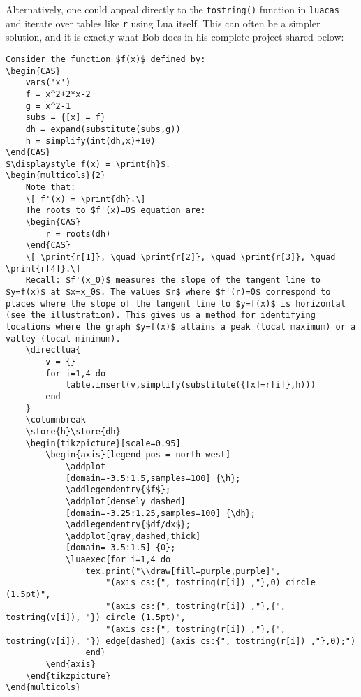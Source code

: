 \documentclass{article}
\begin{document}
Alternatively, one could appeal directly to the \texttt{tostring()} function in \texttt{luacas} and iterate over tables like \texttt{r} using Lua itself. This can often be a simpler solution, and it is exactly what Bob does in his complete project shared below:
\begin{verbatim}
Consider the function $f(x)$ defined by:
\begin{CAS}
    vars('x')
    f = x^2+2*x-2
    g = x^2-1
    subs = {[x] = f}
    dh = expand(substitute(subs,g))
    h = simplify(int(dh,x)+10)
\end{CAS}
$\displaystyle f(x) = \print{h}$.
\begin{multicols}{2}
    Note that: 
    \[ f'(x) = \print{dh}.\] 
    The roots to $f'(x)=0$ equation are:
    \begin{CAS}
        r = roots(dh)
    \end{CAS}
    \[ \print{r[1]}, \quad \print{r[2]}, \quad \print{r[3]}, \quad \print{r[4]}.\] 
    Recall: $f'(x_0)$ measures the slope of the tangent line to $y=f(x)$ at $x=x_0$. The values $r$ where $f'(r)=0$ correspond to places where the slope of the tangent line to $y=f(x)$ is horizontal (see the illustration). This gives us a method for identifying locations where the graph $y=f(x)$ attains a peak (local maximum) or a valley (local minimum). 
    \directlua{
        v = {}
        for i=1,4 do 
            table.insert(v,simplify(substitute({[x]=r[i]},h)))
        end
    }
    \columnbreak 
    \store{h}\store{dh}
    \begin{tikzpicture}[scale=0.95]
        \begin{axis}[legend pos = north west]
            \addplot 
            [domain=-3.5:1.5,samples=100] {\h};
            \addlegendentry{$f$};
            \addplot[densely dashed] 
            [domain=-3.25:1.25,samples=100] {\dh};
            \addlegendentry{$df/dx$};
            \addplot[gray,dashed,thick]
            [domain=-3.5:1.5] {0};
            \luaexec{for i=1,4 do 
                tex.print("\\draw[fill=purple,purple]",
                    "(axis cs:{", tostring(r[i]) ,"},0) circle (1.5pt)",
                    "(axis cs:{", tostring(r[i]) ,"},{", tostring(v[i]), "}) circle (1.5pt)",
                    "(axis cs:{", tostring(r[i]) ,"},{", tostring(v[i]), "}) edge[dashed] (axis cs:{", tostring(r[i]) ,"},0);")
                end}
        \end{axis}
    \end{tikzpicture}
\end{multicols}
\end{verbatim}
\end{document}
